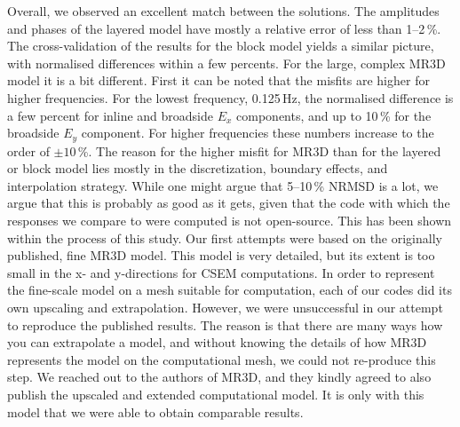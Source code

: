 \documentclass[extra, camera,%
]{gji}
\begin{document}
Overall, we observed an excellent match between the solutions. The amplitudes and phases of the layered model have mostly a relative error of less than 1--2\,\%. The cross-validation of the results for the block model yields a similar picture, with normalised differences within a few percents. For the large, complex MR3D model it is a bit different. First it can be noted that the misfits are higher for higher frequencies. For the lowest frequency, 0.125\,Hz, the normalised difference is a few percent for inline and broadside $E_x$ components, and up to 10\,\% for the broadside $E_y$ component. For higher frequencies these numbers increase to the order of $\pm10\,$\%. The reason for the higher misfit for MR3D than for the layered or block model lies mostly in the discretization, boundary effects, and interpolation strategy. While one might argue that 5--10\,\% NRMSD is a lot, we argue that this is probably as good as it gets, given that the code with which the responses we compare to were computed is not open-source. This has been shown within the process of this study. Our first attempts were based on the originally published, fine MR3D model. This model is very detailed, but its extent is too small in the x- and y-directions for CSEM computations. In order to represent the fine-scale model on a mesh suitable for computation, each of our codes did its own upscaling and extrapolation. However, we were unsuccessful in our attempt to reproduce the published results.  The reason is that there are many ways how you can extrapolate a model, and without knowing the details of how MR3D represents the model on the computational mesh, we could not re-produce this step. We reached out to the authors of MR3D, and they kindly agreed to also publish the upscaled and extended computational model. It is only with this model that we were able to obtain comparable results.
\end{document}
